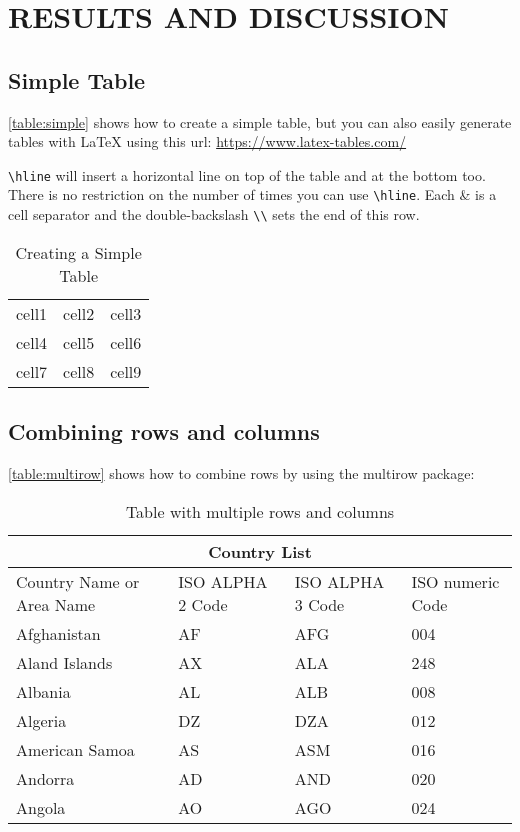 \section{RESULTS AND DISCUSSION}
\label{sec:RESULTS AND DISCUSSION}

\subsection{Simple Table}

\noindent \autoref{table:simple} shows how to create a simple table, but you can also easily generate tables with LaTeX using this url: \url{https://www.latex-tables.com/}

\verb|\hline| will insert a horizontal line on top of the table and at the bottom too. There is no restriction on the number of times you can use \verb|\hline|. Each \& is a cell separator and the double-backslash \verb|\\|  sets the end of this row.

    \begin{table}[htbp]
    \caption{Creating a Simple Table}
    \begin{center}
    \begin{tabular}{ |c|c|c| } 
     \hline
     cell1 & cell2 & cell3 \\ 
     cell4 & cell5 & cell6 \\ 
     cell7 & cell8 & cell9 \\ 
     \hline
    \end{tabular}
    \end{center}
    \label{table:simple}
    \end{table}


\subsection{Combining rows and columns}

\noindent \autoref{table:multirow} shows how to combine rows by using the multirow package:

    \begin{table}[htbp]
    \caption{Table with multiple rows and columns}
    \begin{tabular}{ |p{3cm}||p{3cm}|p{3cm}|p{3cm}|  }
     \hline
     \multicolumn{4}{|c|}{Country List} \\
     \hline
     Country Name or Area Name& ISO ALPHA 2 Code &ISO ALPHA 3 Code&ISO numeric Code\\
     \hline
     Afghanistan   & AF    &AFG&   004\\
     Aland Islands&   AX  & ALA   &248\\
     Albania &AL & ALB&  008\\
     Algeria    &DZ & DZA&  012\\
     American Samoa&   AS  & ASM&016\\
     Andorra& AD  & AND   &020\\
     Angola& AO  & AGO&024\\
     \hline
    \end{tabular}
    \label{table:multirow}
    \end{table}

